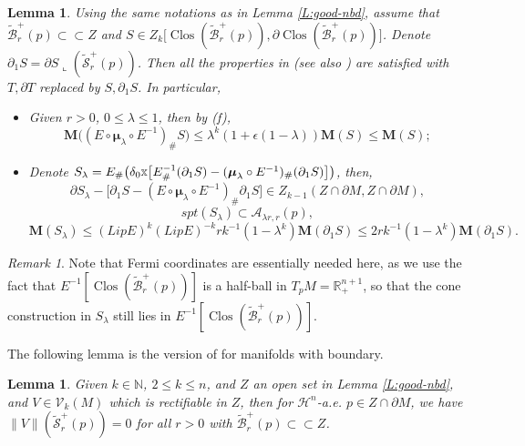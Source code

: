 \documentclass[10pt]{amsart}
\newtheorem{lemma}[theorem]{Lemma}
\theoremstyle{definition}
\theoremstyle{remark}
\newtheorem{remark}[theorem]{Remark}
\numberwithin{equation}{section}
\newcommand{\V}{\mathcal{V}}
\newcommand{\N}{\mathbb{N}}
\newcommand{\mH}{\mathcal{H}}
\newcommand{\A}{\mathcal{A}}
\newcommand{\la}{\lambda}
\newcommand{\lc}{\llcorner}
\newcommand{\de}{\delta}
\newcommand{\ep}{\epsilon}
\newcommand{\M}{\mathbf{M}}
\newcommand{\bmu}{\boldsymbol \mu}
\newcommand{\ttimes}{\scalebox{0.7}{$\mathbb{X}$}}
\newcommand{\tBcal}{\widetilde{\mathcal{B}}}
\newcommand{\tScal}{\widetilde{\mathcal{S}}}
\newcommand{\Clos}{\operatorname{Clos}}
\begin{document}
\begin{lemma}
\label{L:local-scaling}
Using the same notations as in Lemma \ref{L:good-nbd}, assume that $\tBcal^+_r(p) \subset \subset Z$ and $S \in Z_k \big[ \Clos(\tBcal^+_r(p)), \partial \Clos(\tBcal^+_r(p)) \big]$. Denote $\partial_1 S=\partial S\lc (\tScal^+_r(p))$.  Then all the properties in \cite[3.4(7)]{Pitts} (see also \cite[\S 7.2(j)(k)]{Zhou17}) are satisfied with $T, \partial T$ replaced by $S, \partial_1 S$. In particular,
\begin{itemize}
\item[$(g)$] Given $r>0$, $0\leq \la\leq 1$, then by (f),
\[ \M\big((E\circ \bmu_\la \circ E^{-1})_{\#}S\big)\leq \la^k(1+\ep(1-\la))\M(S)\leq \M(S);\]

\item[$(h)$] Denote $S_{\la}=E_{\#}\big(\de_0\ttimes\big[E^{-1}_{\#}(\partial_1 S)-(\bmu_\la \circ E^{-1})_{\#}(\partial_1 S)\big]\big)$, then,
\[ \partial S_{\la}-\big[\partial_1 S-(E\circ \bmu_\la \circ E^{-1})_{\#}\partial_1 S\big] \in Z_{k-1}(Z\cap\partial M, Z\cap\partial M), \]
\[ spt(S_{\la})\subset \A_{\la r, r}(p), \]
\[ \M(S_{\la})\leq (Lip E)^k(Lip E)^{-k}r k^{-1}(1-\la^k)\M(\partial_1 S)\leq 2 r k^{-1}(1-\la^k)\M(\partial_1 S). \]
\end{itemize}
\end{lemma}

\begin{remark}
Note that Fermi coordinates are essentially needed here, as we use the fact that $E^{-1}[\Clos(\tBcal^+_r(p))]$ is a half-ball in $T_pM=\mathbb{R}^{n+1}_+$, so that the cone construction in $S_\la$ still lies in $E^{-1}[\Clos(\tBcal^+_r(p))]$.
\end{remark}


The following lemma is the version of \cite[Lemma 3.6]{Pitts} for manifolds with boundary.

\begin{lemma}
\label{no mass on spheres}
Given $k\in\N$, $2\leq k\leq n$, and $Z$ an open set in Lemma \ref{L:good-nbd}, and $V \in \V_k(M)$ which is rectifiable in $Z$, then for $\mH^{n}$-a.e. $p\in Z\cap\partial M$, we have $\|V\|(\tScal^+_r(p))=0$ for all $r>0$ with $\tBcal^+_r(p) \subset \subset Z$.
\end{lemma}
\end{document}
